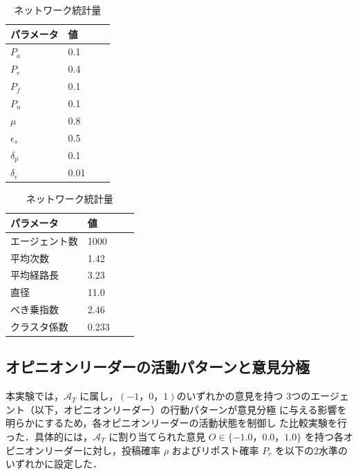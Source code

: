 \documentclass[a4j]{ujarticle}
\def\AgentSet{\mathcal{A}}
\def\post{\rho} %
\def\BoundedConfidence{\epsilon}
\def\stubbornness{\mu}
\begin{document}
\begin{table}[t]\tabcolsep=5.0pt
  \begin{minipage}[t]{0.2\textwidth}
   \centering
   \caption{実験パラメータ}\label{tab:expparameters}
   \begin{tabular}{llcl}
     \toprule
     パラメータ & 値 \\
     \midrule
     $P_a$ & 0.1 \\
     $P_r$ & 0.4 \\
     $P_f$ & 0.1 \\
     $P_u$ & 0.1 \\
     $\stubbornness$ & 0.8\\
     $\epsilon_s$ & 0.5\\
     $\delta_p$ & 0.1 \\ 
     $\delta_\BoundedConfidence$ & 0.01 \\
     \bottomrule
   \end{tabular}
  \end{minipage}
  \hfill
  \begin{minipage}[t]{0.3\textwidth}
    \centering
    \caption{ネットワーク統計量}\label{tab:networkparameters}
    \begin{tabular}{llcl}
      \toprule
      パラメータ & 値 \\
      \midrule
      エージェント数 & 1000 \\
      平均次数 & 1.42 \\
      平均経路長 & 3.23 \\
      直径 & 11.0 \\ 
      べき乗指数 & 2.46 \\
      クラスタ係数 & 0.233 \\
      \bottomrule
    \end{tabular}
  \end{minipage}
  \end{table}


\subsection{オピニオンリーダーの活動パターンと意見分極}
本実験では，$\AgentSet_{T}$ に属し，$(-1，0，1)$のいずれかの意見を持つ
3つのエージェント（以下，オピニオンリーダー）の行動パターンが意見分極
に与える影響を明らかにするため，各オピニオンリーダーの活動状態を制御し
た比較実験を行った．具体的には，$\AgentSet_{T}$ に割り当てられた意見
$O \in \{-1.0，0.0，1.0\}$ を持つ各オピニオンリーダーに対し，投稿確率
$\post$ およびリポスト確率 $P_{r}$ を以下の2水準のいずれかに設定した．
\end{document}

